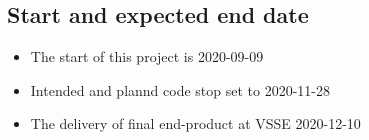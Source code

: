 \subsection{Start and expected end date}
\begin{itemize}
    \item The start of this project is 2020-09-09
    \item Intended and plannd code stop set to 2020-11-28
    \item The delivery of final end-product at VSSE 2020-12-10
\end{itemize}